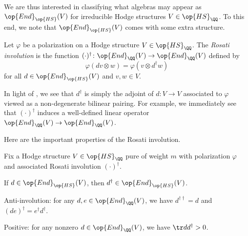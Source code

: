 \documentclass[../thesis.tex]{subfiles}
\begin{document}
We are thus interested in classifying what algebras may appear as $\op{End}_{\op{HS}}(V)$ for irreducible Hodge structures $V\in\op{HS}_\QQ$. To this end, we note that $\op{End}_{\op{HS}}(V)$ comes with some extra structure.
\begin{definition}
	Let $\varphi$ be a polarization on a Hodge structure $V\in\op{HS}_\QQ$. The \textit{Rosati involu\-tion} is the function $(\cdot)^\dagger\colon\op{End}_{\QQ}(V)\to\op{End}_{\QQ}(V)$ defined by
	\[\varphi(dv\otimes w)=\varphi(v\otimes d^\dagger w)\]
	for all $d\in\op{End}_{\op{HS}}(V)$ and $v,w\in V$.
\end{definition}
\begin{remark} \label{rem:rosati-is-adjoint}
	In light of , we see that $d^\dagger$ is simply the adjoint of $d\colon V\to V$ associated to $\varphi$ viewed as a non-degenerate bilinear pairing. For example, we immediately see that $(\cdot)^\dagger$ induces a well-defined linear operator $\op{End}_\QQ(V)\to\op{End}_\QQ(V)$.
\end{remark}
Here are the important properties of the Rosati involution.
\begin{lemma}
	Fix a Hodge structure $V\in\op{HS}_\QQ$ pure of weight $m$ with polarization $\varphi$ and associated Rosati involution $(\cdot)^\dagger$.
	\begin{listalph}
		\item If $d\in\op{End}_{\op{HS}}(V)$, then $d^\dagger\in\op{End}_{\op{HS}}(V)$.
		\item Anti-involution: for any $d,e\in\op{End}_{\QQ}(V)$, we have $d^{\dagger\dagger}=d$ and $(de)^\dagger=e^\dagger d^\dagger$.
		\item Positive: for any nonzero $d\in\op{End}_{\QQ}(V)$, we have $\tr dd^\dagger>0$.
	\end{listalph}
\end{lemma}
\end{document}
